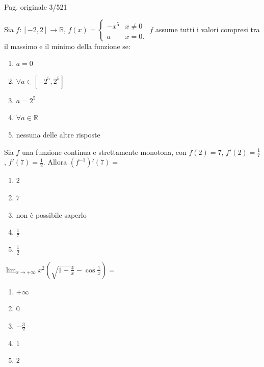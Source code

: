 \par\noindent\hfill{\color{cyan!65!black}\scriptsize Pag. originale 3/521}\par\smallskip
\begin{quiz}
Sia $f:[-2,2]\to\mathbb R$, $f(x)=\begin{cases}-x^5&x\ne0\\a&x=0.\end{cases}$
$f$ assume tutti i valori compresi tra il massimo e il minimo della funzione se:
\begin{enumerate}[label=\alph*),leftmargin=1.3cm,itemsep=3pt,topsep=5pt]\item $a=0$\item $\forall a\in[-2^5,2^5]$\item $a=2^5$\item $\forall a\in\mathbb R$\item nessuna delle altre risposte\end{enumerate}
\end{quiz}

\begin{quiz}
Sia $f$ una funzione continua e strettamente monotona, con $f(2)=7$, $f'(2)=\frac17$, $f'(7)=\frac12$. Allora $(f^{-1})'(7)=$
\begin{enumerate}[label=\alph*),leftmargin=1.3cm,itemsep=3pt,topsep=5pt]\item $2$\item $7$\item non \`e possibile saperlo\item $\frac17$\item $\frac12$\end{enumerate}
\end{quiz}

\begin{quiz}
$\displaystyle\lim_{x\to+\infty}x^2\left(\sqrt{1+\frac4x}-\cos\frac1x\right)=$
\begin{enumerate}[label=\alph*),leftmargin=1.3cm,itemsep=3pt,topsep=5pt]\item $+\infty$\item $0$\item $-\frac32$\item $1$\item $2$\end{enumerate}
\end{quiz}

